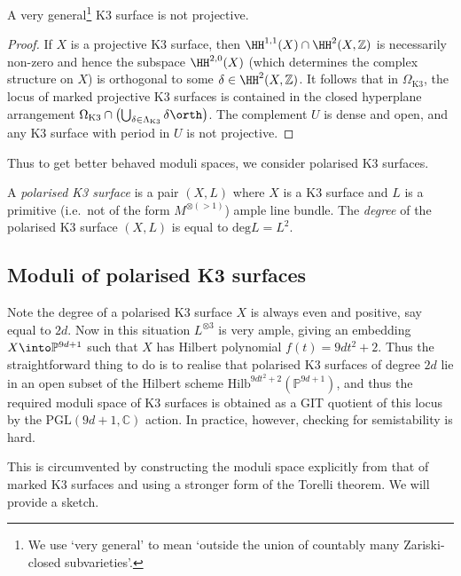 \begin{corollary}
    A very general\footnote{We use `very general' to mean `outside the union
    of countably many Zariski-closed subvarieties'.} K3 surface is not
    projective.
    \begin{proof}
        If \(X\) is a projective K3 surface, then \(\HH^{1,1}(X)\cap
        \HH^2(X,\mathbb{Z})\) is necessarily non-zero and hence the subspace
        \(\HH^{2,0}(X)\) (which determines the complex structure on \(X\)) is
        orthogonal to some \(\delta \in \HH^2(X,\mathbb{Z})\). It follows that
        in \(\Omega_\text{K3}\), the locus of marked projective K3 surfaces is
        contained in the closed hyperplane arrangement
        \(\Omega_\text{K3}\cap \left(\bigcup_{\delta\in
        \Lambda_\text{K3}}\delta\orth\right)\). The complement \(U\) is dense
        and open, and any K3 surface with period in \(U\) is not projective.
    \end{proof}
\end{corollary}

Thus to get better behaved moduli spaces, we consider polarised K3 surfaces.

\begin{definition}
    A \textit{polarised K3 surface} is a pair \((X,L)\) where \(X\) is a K3
    surface and \(L\) is a primitive (i.e.\ not of the form \(M^{\otimes (>1)}\))
    ample line bundle. The \textit{degree} of the polarised K3 surface \((X,L)\)
    is equal to \(\text{deg}L=L^2\).
\end{definition}

\subsection{Moduli of polarised K3 surfaces} Note the degree of a polarised K3
surface \(X\) is always even and positive, say equal to \(2d\). Now in this
situation \(L^{\otimes 3}\) is very ample, giving an embedding \(X\into
\mathbb{P}^{9d+1}\) such that \(X\) has Hilbert polynomial \(f(t)=9d t^2+2\).
Thus the straightforward thing to do is to realise that polarised K3 surfaces of
degree \(2d\) lie in an open subset of the Hilbert scheme
\(\text{Hilb}^{9dt^2+2}(\mathbb{P}^{9d+1})\), and thus the required moduli space
of K3 surfaces is obtained as a GIT quotient of this locus by the
\(\text{PGL}(9d+1,\mathbb{C})\) action. In practice, however, checking for
semistability is hard.

This is circumvented by constructing the moduli space explicitly from that of
marked K3 surfaces and using a stronger form of the Torelli theorem. We will
provide a sketch.

